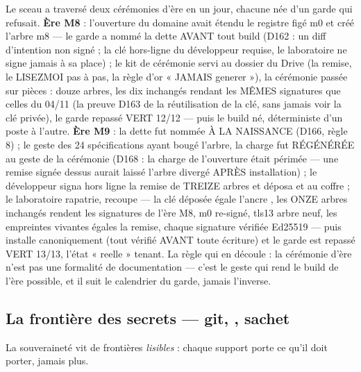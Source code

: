 Le sceau a traversé deux cérémonies d'ère en un jour, chacune née d'un garde qui
refusait. \textbf{Ère M8} : l'ouverture du domaine  avait étendu le
registre figé m0 et créé l'arbre m8 — le garde a nommé la dette AVANT tout build
(D162 : un diff d'intention non signé ; la clé hors-ligne du développeur requise,
le laboratoire ne signe jamais à sa place) ; le kit de cérémonie servi au dossier
 du Drive (la remise, le LISEZMOI pas à pas, la règle d'or
« JAMAIS generer »), la cérémonie passée sur pièces : douze arbres, les dix
inchangés rendant les MÊMES signatures que celles du 04/11 (la preuve D163 de la
réutilisation de la clé, sans jamais voir la clé privée), le garde repassé VERT
12/12 — puis le build  né, déterministe d'un poste à l'autre.
\textbf{Ère M9} : la dette fut nommée À LA NAISSANCE (D166, règle 8) ; le geste
des 24 spécifications ayant bougé l'arbre, la charge fut RÉGÉNÉRÉE au geste de la
cérémonie (D168 : la charge de l'ouverture était périmée — une remise signée
dessus aurait laissé l'arbre divergé APRÈS installation) ; le développeur signa
hors ligne la remise de TREIZE arbres et déposa  et
 au coffre  ; le laboratoire rapatrie,
recoupe — la clé déposée égale l'ancre , les ONZE arbres
inchangés rendent les signatures de l'ère M8, m0 re-signé, tls13 arbre neuf, les
empreintes vivantes égales la remise, chaque signature vérifiée Ed25519 — puis
installe canoniquement (tout vérifié AVANT toute écriture) et le garde est
repassé VERT 13/13, l'état « reelle » tenant. La règle qui en découle : la
cérémonie d'ère n'est pas une formalité de documentation — c'est le geste qui
rend le build de l'ère possible, et il suit le calendrier du garde, jamais
l'inverse.

\subsection{La frontière des secrets — git, , sachet}\label{sec:frontiere}

La souveraineté vit de frontières \emph{lisibles} : chaque support porte ce qu'il doit
porter, jamais plus.

